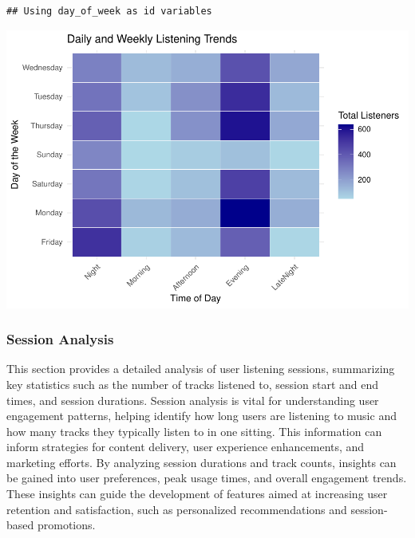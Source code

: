 \documentclass[
]{article}
\begin{document}
\begin{verbatim}
## Using day_of_week as id variables
\end{verbatim}

\includegraphics{SpotifyProjectPDF_files/figure-latex/unnamed-chunk-6-1.pdf}

\subsubsection{Session Analysis}\label{session-analysis}

This section provides a detailed analysis of user listening sessions,
summarizing key statistics such as the number of tracks listened to,
session start and end times, and session durations. Session analysis is
vital for understanding user engagement patterns, helping identify how
long users are listening to music and how many tracks they typically
listen to in one sitting. This information can inform strategies for
content delivery, user experience enhancements, and marketing efforts.
By analyzing session durations and track counts, insights can be gained
into user preferences, peak usage times, and overall engagement trends.
These insights can guide the development of features aimed at increasing
user retention and satisfaction, such as personalized recommendations
and session-based promotions.
\end{document}
